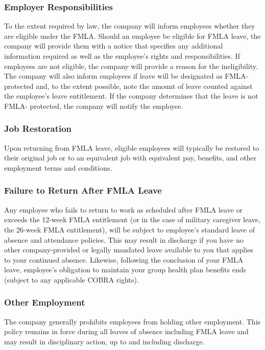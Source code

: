 \documentclass{book}
\begin{document}
\subsubsection{Employer Responsibilities}

To the extent required by law, the company will inform employees whether they are eligible under the FMLA. Should an employee be eligible for FMLA leave, the company will provide them with a notice that specifies any additional information required as well as the employee's rights and responsibilities. If employees are not eligible, the company will provide a reason for the ineligibility. The company will also inform employees if leave will be designated as FMLA-protected and, to the extent possible, note the amount of leave counted against the employee's leave entitlement. If the company determines that the leave is not FMLA- protected, the company will notify the employee.

\subsubsection{Job Restoration}

Upon returning from FMLA leave, eligible employees will typically be restored to their original job or to an equivalent job with equivalent pay, benefits, and other employment terms and conditions.

\subsubsection{Failure to Return After FMLA Leave}

Any employee who fails to return to work as scheduled after FMLA leave or exceeds the 12-week FMLA entitlement (or in the case of military caregiver leave, the 26-week FMLA entitlement), will be subject to employee's standard leave of absence and attendance policies. This may result in discharge if you have no other company-provided or legally mandated leave available to you that applies to your continued absence. Likewise, following the conclusion of your FMLA leave, employee's obligation to maintain your group health plan benefits ends (subject to any applicable COBRA rights).

\subsubsection{Other Employment}

The company generally prohibits employees from holding other employment. This policy remains in force during all leaves of absence including FMLA leave and may result in disciplinary action, up to and including discharge.
\end{document}
